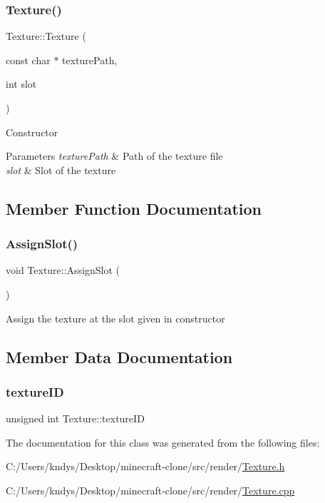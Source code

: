 \subsubsection{\texorpdfstring{Texture()}{Texture()}}
{\footnotesize\ttfamily Texture\+::\+Texture (\begin{DoxyParamCaption}\item[{const char $\ast$}]{texture\+Path,  }\item[{int}]{slot }\end{DoxyParamCaption})}



Constructor 


\begin{DoxyParams}{Parameters}
{\em texture\+Path} & Path of the texture file\\
\hline
{\em slot} & Slot of the texture\\
\hline
\end{DoxyParams}


\subsection{Member Function Documentation}
\mbox{\label{class_texture_a67785884b84d16cd6a35f6d664644747}} 
\subsubsection{\texorpdfstring{Assign\+Slot()}{AssignSlot()}}
{\footnotesize\ttfamily void Texture\+::\+Assign\+Slot (\begin{DoxyParamCaption}{ }\end{DoxyParamCaption})}



Assign the texture at the slot given in constructor 



\subsection{Member Data Documentation}
\mbox{\label{class_texture_a91e56244efb8d5d29a52cb76264539a8}} 
\subsubsection{\texorpdfstring{texture\+ID}{textureID}}
{\footnotesize\ttfamily unsigned int Texture\+::texture\+ID}



The documentation for this class was generated from the following files\+:\begin{DoxyCompactItemize}
\item 
C\+:/\+Users/kndys/\+Desktop/minecraft-\/clone/src/render/\mbox{\hyperlink{_texture_8h}{Texture.\+h}}\item 
C\+:/\+Users/kndys/\+Desktop/minecraft-\/clone/src/render/\mbox{\hyperlink{_texture_8cpp}{Texture.\+cpp}}\end{DoxyCompactItemize}
